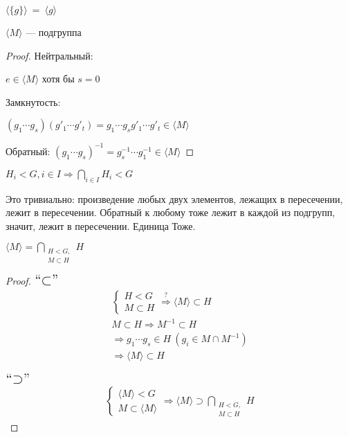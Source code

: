 \notice $\langle \{g\} \rangle \ =\ \langle g \rangle$
\begin{theorem}
  $\langle M \rangle$ --- подгруппа
  \begin{proof}
    Нейтральный:

    $e\in \langle M \rangle$ хотя бы $s = 0$

    Замкнутость: 

    $(g_1 \cdots g_s)(g'_1 \cdots g'_t) = g_1 \cdots g_s g'_1 \cdots g'_t \in \langle M \rangle$

    Обратный:
    $(g_1 \cdots g_s)^{-1} = g_s^{-1} \cdots g_1^{-1} \in \langle M \rangle$  
  \end{proof}
  
\end{theorem}
\notice $H_i < G, i\in I \Longrightarrow \bigcap\limits_{i\in I} H_i < G$

Это тривиально: произведение любых двух элементов, лежащих в пересечении, лежит в пересечении. Обратный к любому тоже лежит в каждой из подгрупп, значит, лежит в пересечении. Единица Тоже.

\begin{theorem}
  $\langle M \rangle = \bigcap\limits_{\substack{H < G, \\ M \subset H}} H $

\begin{proof} \quad

  $\mbox{\Large``$\subset$''}$
  \begin{gather*}
      \begin{cases}
      H < G \\
      M \subset H
      \end{cases}
      \stackrel{?}{\Longrightarrow} \langle M \rangle \subset H \\
      M \subset H \Longrightarrow M^{-1} \subset H \\
      \Longrightarrow g_1 \cdots g_s \in H\ (g_i\in M \cap M^{-1}) \\
      \Longrightarrow \langle M \rangle \subset H
  \end{gather*}
  
  $\mbox{\Large``$\supset$''}$
  \begin{gather*}
      \begin{cases}
      \langle M \rangle < G \\
      M \subset \langle M \rangle
      \end{cases}
      \Longrightarrow \langle M \rangle \supset \bigcap\limits_{\substack{H < G, \\ M \subset H}} H
  \end{gather*}
  
  \end{proof}
\end{theorem}

